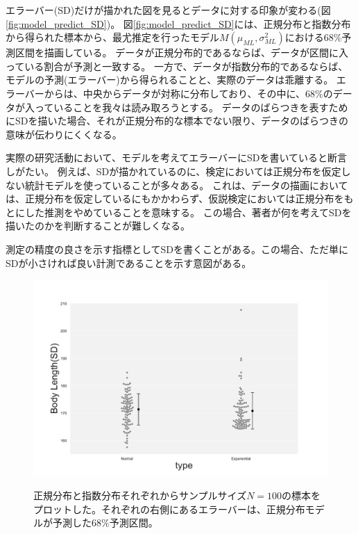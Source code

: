 エラーバー(SD)だけが描かれた図を見るとデータに対する印象が変わる(図\ref{fig:model_predict_SD})。
図\ref{fig:model_predict_SD}には、正規分布と指数分布から得られた標本から、最尤推定を行ったモデル$M(\mu_{ML},\sigma^2_{ML})$における$68\%$予測区間を描画している。
データが正規分布的であるならば、データが区間に入っている割合が予測と一致する。
一方で、データが指数分布的であるならば、モデルの予測(エラーバー)から得られることと、実際のデータは乖離する。
エラーバーからは、中央からデータが対称に分布しており、その中に、$68\%$のデータが入っていることを我々は読み取ろうとする。
データのばらつきを表すためにSDを描いた場合、それが正規分布的な標本でない限り、データのばらつきの意味が伝わりにくくなる。

実際の研究活動において、モデルを考えてエラーバーにSDを書いていると断言しがたい。
例えば、SDが描かれているのに、検定においては正規分布を仮定しない統計モデルを使っていることが多々ある。
これは、データの描画においては、正規分布を仮定しているにもかかわらず、仮説検定においては正規分布をもとにした推測をやめていることを意味する。
この場合、著者が何を考えてSDを描いたのかを判断することが難しくなる。

測定の精度の良さを示す指標としてSDを書くことがある。この場合、ただ単にSDが小さければ良い計測であることを示す意図がある。

\begin{figure}
    \begin{center}
        \includegraphics[width=15cm]{./image/12_/sample_norm_expon.pdf}
        \label{fig:sample_norm_expon_model}
        \caption{正規分布と指数分布それぞれからサンプルサイズ$N=100$の標本をプロットした。それぞれの右側にあるエラーバーは、正規分布モデルが予測した$68\%$予測区間。}
      \end{center}
    \end{figure}


